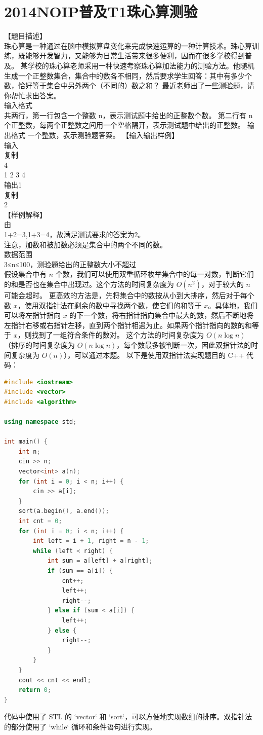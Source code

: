 \documentclass[12pt,twiside,a4paper]{ctexbook}
\numberwithin{chapter}{part}
\begin{document}
\section{2014NOIP普及T1珠心算测验}
【题目描述】\\
珠心算是一种通过在脑中模拟算盘变化来完成快速运算的一种计算技术。珠心算训练，既能够开发智力，又能够为日常生活带来很多便利，因而在很多学校得到普及。
某学校的珠心算老师采用一种快速考察珠心算加法能力的测验方法。他随机生成一个正整数集合，集合中的数各不相同，然后要求学生回答：其中有多少个数，恰好等于集合中另外两个（不同的）数之和？
最近老师出了一些测验题，请你帮忙求出答案。\\
输入格式\\
共两行，第一行包含一个整数
n，表示测试题中给出的正整数个数。
第二行有
n个正整数，每两个正整数之间用一个空格隔开，表示测试题中给出的正整数。
输出格式
一个整数，表示测验题答案。
【输入输出样例】\\
输入\\
复制\\
4\\
1 2 3 4\\
输出1\\
复制\\
2\\
【样例解释】\\
由\\
1+2=3,1+3=4，故满足测试要求的答案为2。\\
注意，加数和被加数必须是集合中的两个不同的数。\\
数据范围\\
3≤n≤100，测验题给出的正整数大小不超过\\
假设集合中有 $n$ 个数，我们可以使用双重循环枚举集合中的每一对数，判断它们的和是否也在集合中出现过。这个方法的时间复杂度为 $O(n^2)$，对于较大的 $n$ 可能会超时。
更高效的方法是，先将集合中的数按从小到大排序，然后对于每个数 $x$，使用双指针法在剩余的数中寻找两个数，使它们的和等于 $x$。具体地，我们可以将左指针指向 $x$ 的下一个数，将右指针指向集合中最大的数，然后不断地将左指针右移或右指针左移，直到两个指针相遇为止。如果两个指针指向的数的和等于 $x$，则找到了一组符合条件的数对。
这个方法的时间复杂度为 $O(n \log n)$（排序的时间复杂度为 $O(n \log n)$，每个数最多被判断一次，因此双指针法的时间复杂度为 $O(n)$），可以通过本题。
以下是使用双指针法实现题目的 C++ 代码：
\begin{lstlisting}[language=C++]
#include <iostream>
#include <vector>
#include <algorithm>

using namespace std;

int main() {
    int n;
    cin >> n;
    vector<int> a(n);
    for (int i = 0; i < n; i++) {
        cin >> a[i];
    }
    sort(a.begin(), a.end());
    int cnt = 0;
    for (int i = 0; i < n; i++) {
        int left = i + 1, right = n - 1;
        while (left < right) {
            int sum = a[left] + a[right];
            if (sum == a[i]) {
                cnt++;
                left++;
                right--;
            } else if (sum < a[i]) {
                left++;
            } else {
                right--;
            }
        }
    }
    cout << cnt << endl;
    return 0;
}
\end{lstlisting}
代码中使用了 STL 的 `vector` 和 `sort`，可以方便地实现数组的排序。双指针法的部分使用了 `while` 循环和条件语句进行实现。
\end{document}
